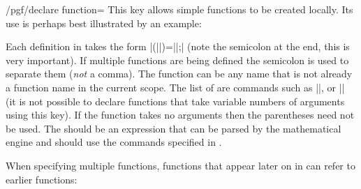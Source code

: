 \begin{key}{/pgf/declare function=}
  This key allows simple functions to be created locally. Its use
  is perhaps best illustrated by an example:

\begin{codeexample}[]
\end{codeexample}

  Each definition in  takes the form 
  |(||)=||;| (note the
  semicolon at the end, this is very important). If multiple
  functions are being defined the semicolon is used to separate
  them (\emph{not} a comma).
  The function  can be any name that is not already a 
  function name in the current scope. The list of 
  are commands such as |\x|, or |\y| (it is not possible to declare
  functions that take variable numbers of arguments using this key).
  If the function takes no arguments then the parentheses need not 
  be used. 
  The  should be an expression that can be
  parsed by the mathematical engine and should use the commands
  specified in .

  When specifying multiple functions, functions that appear later
  on in  can refer to earlier functions:

\begin{codeexample}[]
\end{codeexample}

\end{key}
